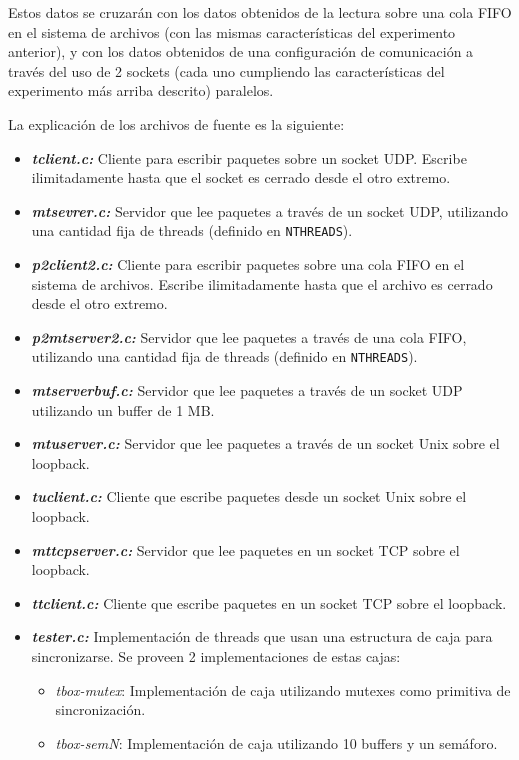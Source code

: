 \documentclass[12pt,spanish,letterpaper]{article}
\begin{document}
\par Estos datos se cruzarán con los datos obtenidos de la lectura sobre una cola FIFO en el sistema de archivos (con las mismas características del experimento anterior), y con los datos obtenidos de una configuración de comunicación a través del uso de 2 sockets (cada uno cumpliendo las características del experimento más arriba descrito) paralelos.
\par La explicación de los archivos de fuente es la siguiente:
\begin{itemize}
	\item \textbf{\emph{tclient.c:}} Cliente para escribir paquetes sobre un socket UDP. Escribe ilimitadamente hasta que el socket es cerrado desde el otro extremo.
	\item \textbf{\emph{mtsevrer.c:}} Servidor que lee paquetes a través de un socket UDP, utilizando una cantidad fija de threads (definido en \verb?NTHREADS?).
	\item \textbf{\emph{p2client2.c:}} Cliente para escribir paquetes sobre una cola FIFO en el sistema de archivos. Escribe ilimitadamente hasta que el archivo es cerrado desde el otro extremo.
	\item \textbf{\emph{p2mtserver2.c:}} Servidor que lee paquetes a través de una cola FIFO, utilizando una cantidad fija de threads (definido en \verb?NTHREADS?).
	\item \textbf{\emph{mtserverbuf.c:}} Servidor que lee paquetes a través de un socket UDP utilizando un buffer de 1 MB.
	\item \textbf{\emph{mtuserver.c:}} Servidor que lee paquetes a través de un socket Unix sobre el loopback.
	\item \textbf{\emph{tuclient.c:}} Cliente que escribe paquetes desde un socket Unix sobre el loopback.
	\item \textbf{\emph{mttcpserver.c:}} Servidor que lee paquetes en un socket TCP sobre el loopback.
	\item \textbf{\emph{ttclient.c:}} Cliente que escribe paquetes en un socket TCP sobre el loopback.
	\item \textbf{\emph{tester.c:}} Implementación de threads que usan una estructura de caja para sincronizarse. Se proveen 2 implementaciones de estas cajas:
	\begin{itemize}
		\item \emph{tbox-mutex}: Implementación de caja utilizando mutexes como primitiva de sincronización.
		\item \emph{tbox-semN}: Implementación de caja utilizando 10 buffers y un semáforo.
	\end{itemize}
\end{itemize}
\end{document}
